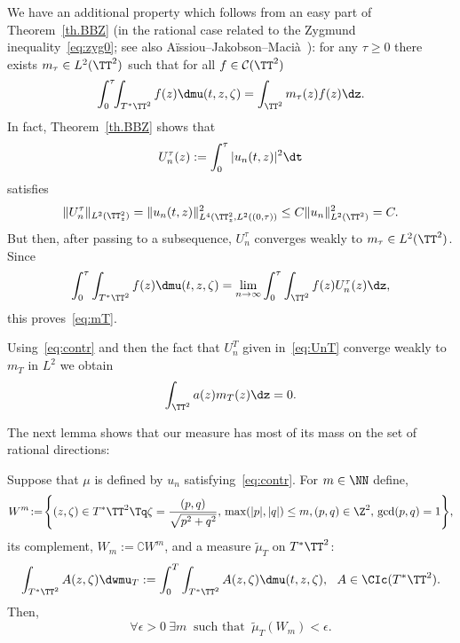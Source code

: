We have an additional property which follows from an easy part of Theorem~\ref{th.BBZ} (in the rational case related to the Zygmund inequality~\eqref{eq:zyg0}; see also Aïssiou--Jakobson--Macià~\cite[Theorem~1.2]{AJM}): for any $ \tau \geq 0 $ there exists $ m_\tau
\in L^2 (\TT^2) $ such that for all $ f \in \mathcal C (\TT^2) $
\begin{equation}\label{eq:mT}
\int_{0}^\tau \!\!\int_{ T^* \TT^2 } f (z) \dmu (t, z, \zeta) =
\int_{\TT^2 } m_\tau (z) f (z) \dz.
\end{equation}
In fact, Theorem~\ref{th.BBZ} shows that
\begin{equation}\label{eq:UnT}
U_n^\tau (z) := \int_{0}^\tau | u_n (t, z) |^2 \dt
\end{equation}
satisfies
\begin{equation}\label{eq:prop22}
\| U^\tau_n \|_{ L^2 (\TT^2_z) } = \| u_n (t, z) \|_{ L^4 (\TT^2_z, L^2 ((0, \tau)) }^2 \leq C \| u_n \|_{L^2 (\TT^2) }^2 = C.
\end{equation}
But then, after passing to a subsequence, $ U_n^\tau $ converges weakly to $ m_\tau \in L^2 (\TT^2) $. Since
\[
\int_{0}^\tau \int_{ T^* \TT^2 } f (z) \dmu (t, z, \zeta) = \lim_{ n \to \infty } \int_{0}^\tau \int_{\TT^2} f (z) U_n^\tau (z) \dz,
\]
this proves~\eqref{eq:mT}.

Using~\eqref{eq:contr} and then the fact that $ U_n^T $ given in~\eqref{eq:UnT} converge weakly to $ m_T $ in $ L^2$ we obtain
\begin{equation}\label{eq:l1}
\int_{\TT^2 } a (z) m_T (z) \dz = 0.
\end{equation}

The next lemma shows that our measure has most of its mass on the set of rational directions:

\begin{lemm}\label{l:2}
Suppose that $\mu $ is defined by $ u_n$ satisfying~\eqref{eq:contr}. For $ m \in \NN $ define,
\[
W^m \!:=\! \left\{ (z, \zeta) \in T^* \TT^2 \Tq \zeta = \frac{ (p, q) }{
\sqrt{ p^2 + q^2 }}, \, \max(|p|, |q|) \leq m, (p, q) \in \Z^2, \, \gcd(p,q) = 1 \right\}\!,
\]
its complement, $ W_m := \complement W^m $, and a measure $ \widetilde \mu_T $ on $ T^* \TT^2 $:
\begin{equation}\label{eq:defwm}
\int_{T^* \TT^2} A (z, \zeta) \dwmu_T := \int_0^T \int_{T^* \TT^2 } A (z, \zeta) \dmu (t, z, \zeta), \ \ A \in \CIc (T^* \TT^2).
\end{equation}
Then,
\begin{equation}\label{eq:l2}
\forall \epsilon > 0 \ \exists m \ \text{ such that } \
\widetilde \mu_T (W_m) < \epsilon.
\end{equation}
\end{lemm}

